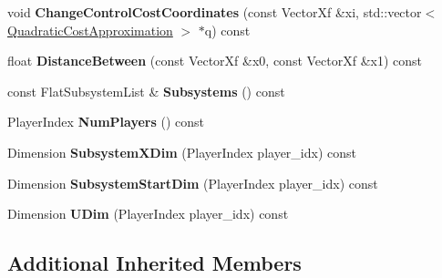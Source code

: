 \begin{DoxyCompactItemize}
\item 
void {\bfseries Change\+Control\+Cost\+Coordinates} (const Vector\+Xf \&xi, std\+::vector$<$ \hyperlink{structilqgames_1_1_quadratic_cost_approximation}{Quadratic\+Cost\+Approximation} $>$ $\ast$q) const \hypertarget{classilqgames_1_1_concatenated_flat_system_a41de9dc81c1e121c0967f6c6f9a1e966}{}\label{classilqgames_1_1_concatenated_flat_system_a41de9dc81c1e121c0967f6c6f9a1e966}

\item 
float {\bfseries Distance\+Between} (const Vector\+Xf \&x0, const Vector\+Xf \&x1) const \hypertarget{classilqgames_1_1_concatenated_flat_system_aa8d39832e2b73f2666415639e02ccc4e}{}\label{classilqgames_1_1_concatenated_flat_system_aa8d39832e2b73f2666415639e02ccc4e}

\item 
const Flat\+Subsystem\+List \& {\bfseries Subsystems} () const \hypertarget{classilqgames_1_1_concatenated_flat_system_a85bf62fb46eb94efe02131b6f73f0157}{}\label{classilqgames_1_1_concatenated_flat_system_a85bf62fb46eb94efe02131b6f73f0157}

\item 
Player\+Index {\bfseries Num\+Players} () const \hypertarget{classilqgames_1_1_concatenated_flat_system_a502e29574127d8dc373beeab9306edde}{}\label{classilqgames_1_1_concatenated_flat_system_a502e29574127d8dc373beeab9306edde}

\item 
Dimension {\bfseries Subsystem\+X\+Dim} (Player\+Index player\+\_\+idx) const \hypertarget{classilqgames_1_1_concatenated_flat_system_ab721151b47937d8a8f4523b2a1ef12f1}{}\label{classilqgames_1_1_concatenated_flat_system_ab721151b47937d8a8f4523b2a1ef12f1}

\item 
Dimension {\bfseries Subsystem\+Start\+Dim} (Player\+Index player\+\_\+idx) const \hypertarget{classilqgames_1_1_concatenated_flat_system_af2aa76a51e22b4fa744b1f8e425216ff}{}\label{classilqgames_1_1_concatenated_flat_system_af2aa76a51e22b4fa744b1f8e425216ff}

\item 
Dimension {\bfseries U\+Dim} (Player\+Index player\+\_\+idx) const \hypertarget{classilqgames_1_1_concatenated_flat_system_a2cb3c62d20eeac814f1b72e4d8355b80}{}\label{classilqgames_1_1_concatenated_flat_system_a2cb3c62d20eeac814f1b72e4d8355b80}

\end{DoxyCompactItemize}
\subsection*{Additional Inherited Members}


